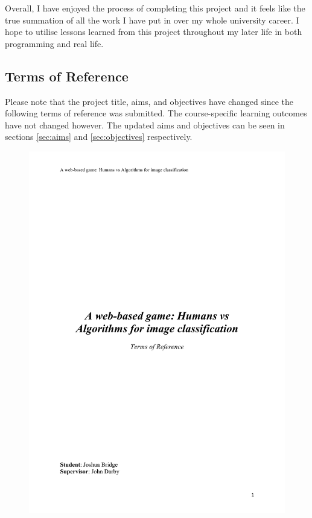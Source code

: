 \documentclass[a4paper,12pt]{report}
\begin{document}
    Overall, I have enjoyed the process of completing this project and it feels like the true summation of all the work I have put in over my whole university career. I hope to utilise lessons learned from this project throughout my later life in both programming and real life.

\newpage
\singlespacing




\begin{appendices}

  \chapter{Terms of Reference} \label{app:tor}
    Please note that the project title, aims, and objectives have changed since the following terms of reference was submitted. The course-specific learning outcomes have not changed however. The updated aims and objectives can be seen in sections \ref{sec:aims} and \ref{sec:objectives} respectively.

    \begin{figure}[h]
      \centering
      \includegraphics[scale=0.8]{tor-1}
    \end{figure}


\end{appendices}
\end{document}

